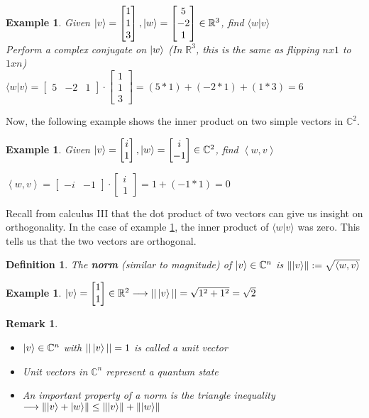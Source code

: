 \documentclass[12pt]{article}
\theoremstyle{plain}
\theoremstyle{nonumberplain}
\theoremstyle{plain}
\newtheorem{definition}[lemma]{Definition}
\newtheorem{example}[lemma]{Example}
\newtheorem{remark}[lemma]{Remark}
\theoremstyle{nonumberplain}
\newcommand\1{{\bf 1}}
\newcommand{\bmat}[1]{\begin{bmatrix*} #1 \end{bmatrix*}} %
\newcommand{\R}{\mathbb{R}} %
\newcommand{\C}{\mathbb{C}} %
\newcommand{\<}{\left\langle}
\renewcommand{\>}{\right\rangle}
\newcommand{\norm}[1]{\left\lVert#1\right\rVert} %
\newcommand{\inp}[2]{\left\langle#1, #2\right\rangle} %
\begin{document}
\begin{example}
Given $\ket{v}=\bmat{1 \\ 1\\ 3}, \ket{w}=\bmat{5 \\ -2 \\ 1}\in\R^3$, find $\langle w|v \rangle$ \\
\indent Perform a complex conjugate on $\ket{w}$ (In $\R^3$, this is the same as flipping $nx1$ to $1xn$) \\
\indent $\langle w|v \rangle=\bmat{5 & -2 & 1}\cdot\bmat{1 \\ 1 \\ 3}=(5*1)+(-2*1)+(1*3)=6$
\end{example}
Now, the following example shows the inner product on two simple vectors in $\C^2$.
\begin{example}\label{ex:cpcmp}
Given $\ket{v}=\bmat{i \\ 1}, \ket{w}=\bmat{i \\ -1}\in\C^2$, find $\inp{w}{v}$
\begin{center}
$\inp{w}{v}=\bmat{-i & -1}\cdot\bmat{i \\ 1}=1+(-1*1)=0$
\end{center}
\end{example}
Recall from calculus III that the dot product of two vectors can give us insight on orthogonality. In the case of example \ref{ex:cpcmp}, the inner product of $\langle w|v \rangle$ was zero. This tells us that the two vectors are orthogonal.
\begin{definition}
The \textbf{norm} (similar to magnitude) of $\ket{v}\in\C^n$ is $\norm{\ket{v}}:=\sqrt{\inp{w}{v}}$ 
\end{definition}
\begin{example}
$\ket{v}=\bmat{1 \\ 1}\in\R^2\longrightarrow||\ket{v}||=\sqrt{1^2+1^2}=\sqrt{2}$
\end{example}
\begin{remark}
\begin{itemize}
	\item $\ket{v}\in\C^n$ with $||\ket{v}||=1$ is called a unit vector
	\item Unit vectors in $\C^n$ represent a \textit{quantum state}
	\item An important property of a norm is the \textit{triangle inequality} $\longrightarrow\norm{\ket{v}+\ket{w}}\leq\norm{\ket{v}}+\norm{\ket{w}}$
\end{itemize}
\end{remark}
\end{document}
